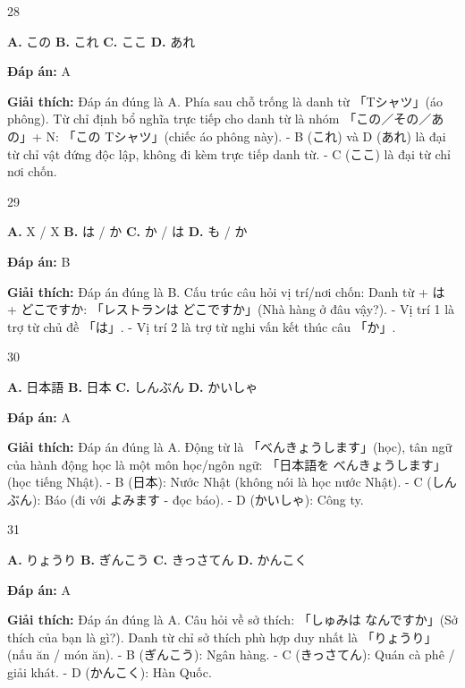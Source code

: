 \documentclass[12pt,a4paper]{report}
\newcommand{\source}[1]{}
\newcommand{\choice}[2]{\textbf{#1.} #2 \quad}
\newcommand{\answer}[1]{\par\textbf{Đáp án:} #1}
\newcommand{\confidence}[1]{}
\newcommand{\explain}[1]{\par\textbf{Giải thích:} #1\vspace{0.5cm}}
\begin{document}
\begin{question}{28}
\source{Q20.jpg}
\choice{A}{この}
\choice{B}{これ}
\choice{C}{ここ}
\choice{D}{あれ}
\answer{A}
\confidence{high}
\explain{Đáp án đúng là A. Phía sau chỗ trống là danh từ 「Tシャツ」(áo phông). Từ chỉ định bổ nghĩa trực tiếp cho danh từ là nhóm 「この／その／あの」+ N: 「この Tシャツ」(chiếc áo phông này).
- B (これ) và D (あれ) là đại từ chỉ vật đứng độc lập, không đi kèm trực tiếp danh từ.
- C (ここ) là đại từ chỉ nơi chốn.}
\end{question}

\begin{question}{29}
\source{Q22.jpg}
\choice{A}{X / X}
\choice{B}{は / か}
\choice{C}{か / は}
\choice{D}{も / か}
\answer{B}
\confidence{high}
\explain{Đáp án đúng là B. Cấu trúc câu hỏi vị trí/nơi chốn: Danh từ + は + どこですか: 「レストランは どこですか」(Nhà hàng ở đâu vậy?).
- Vị trí 1 là trợ từ chủ đề 「は」.
- Vị trí 2 là trợ từ nghi vấn kết thúc câu 「か」.}
\end{question}

\begin{question}{30}
\source{Q25.jpg}
\choice{A}{日本語}
\choice{B}{日本}
\choice{C}{しんぶん}
\choice{D}{かいしゃ}
\answer{A}
\confidence{high}
\explain{Đáp án đúng là A. Động từ là 「べんきょうします」(học), tân ngữ của hành động học là một môn học/ngôn ngữ: 「日本語を べんきょうします」(học tiếng Nhật).
- B (日本): Nước Nhật (không nói là học nước Nhật).
- C (しんぶん): Báo (đi với よみます - đọc báo).
- D (かいしゃ): Công ty.}
\end{question}

\begin{question}{31}
\source{Q26.jpg}
\choice{A}{りょうり}
\choice{B}{ぎんこう}
\choice{C}{きっさてん}
\choice{D}{かんこく}
\answer{A}
\confidence{high}
\explain{Đáp án đúng là A. Câu hỏi về sở thích: 「しゅみは なんですか」(Sở thích của bạn là gì?). Danh từ chỉ sở thích phù hợp duy nhất là 「りょうり」(nấu ăn / món ăn).
- B (ぎんこう): Ngân hàng.
- C (きっさてん): Quán cà phê / giải khát.
- D (かんこく): Hàn Quốc.}
\end{question}
\end{document}
